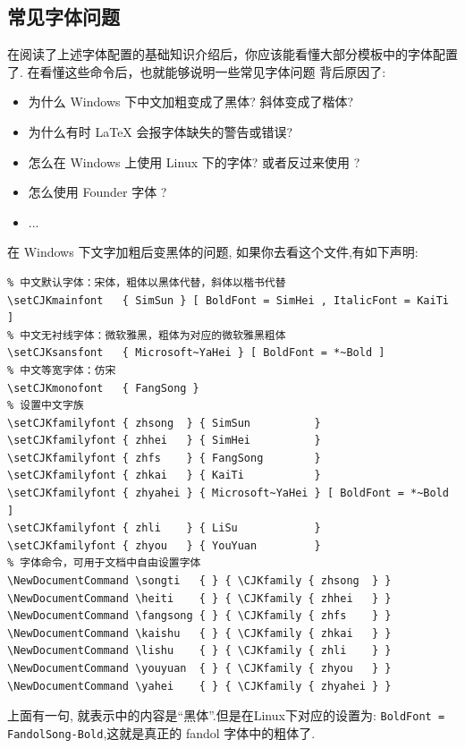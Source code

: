 \subsection{常见字体问题}
在阅读了上述字体配置的基础知识介绍后，你应该能看懂大部分模板中的字体配置了. 在看懂这些命令后，也就能够说明一些常见字体问题
背后原因了:
\begin{itemize}
    \item 为什么 Windows 下中文加粗变成了黑体? 斜体变成了楷体?
    \item 为什么有时 \LaTeX{} 会报字体缺失的警告或错误?
    \item 怎么在 Windows 上使用 Linux 下的字体? 或者反过来使用 ?
    \item 怎么使用 Founder 字体 ?
    \item ...
\end{itemize}

在 Windows 下文字加粗后变黑体的问题,
如果你去看这个文件,有如下声明:
\begin{verbatim}
% 中文默认字体：宋体，粗体以黑体代替，斜体以楷书代替
\setCJKmainfont   { SimSun } [ BoldFont = SimHei , ItalicFont = KaiTi ]
% 中文无衬线字体：微软雅黑，粗体为对应的微软雅黑粗体
\setCJKsansfont   { Microsoft~YaHei } [ BoldFont = *~Bold ]
% 中文等宽字体：仿宋
\setCJKmonofont   { FangSong }
% 设置中文字族
\setCJKfamilyfont { zhsong  } { SimSun          }
\setCJKfamilyfont { zhhei   } { SimHei          }
\setCJKfamilyfont { zhfs    } { FangSong        }
\setCJKfamilyfont { zhkai   } { KaiTi           }
\setCJKfamilyfont { zhyahei } { Microsoft~YaHei } [ BoldFont = *~Bold ]
\setCJKfamilyfont { zhli    } { LiSu            }
\setCJKfamilyfont { zhyou   } { YouYuan         }
% 字体命令，可用于文档中自由设置字体
\NewDocumentCommand \songti   { } { \CJKfamily { zhsong  } }
\NewDocumentCommand \heiti    { } { \CJKfamily { zhhei   } }
\NewDocumentCommand \fangsong { } { \CJKfamily { zhfs    } }
\NewDocumentCommand \kaishu   { } { \CJKfamily { zhkai   } }
\NewDocumentCommand \lishu    { } { \CJKfamily { zhli    } }
\NewDocumentCommand \youyuan  { } { \CJKfamily { zhyou   } }
\NewDocumentCommand \yahei    { } { \CJKfamily { zhyahei } }
\end{verbatim}

上面有一句, 就表示中的内容是``黑体''.但是在Linux下对应的设置为:
\texttt{BoldFont = FandolSong-Bold},这就是真正的 fandol 字体中的粗体了.

